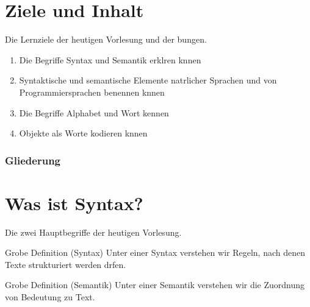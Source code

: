 %
%
%

%
%
%



\subtitle{Text und seine Bedeutung}

\date{27. Oktober 2006}




\begin{frame}
  \maketitle
\end{frame}


\section*{Ziele und Inhalt}

\begin{frame}{Die Lernziele der heutigen Vorlesung und der bungen.} 
  \begin{enumerate}
  \item Die Begriffe Syntax und Semantik erklren knnen
  \item Syntaktische und semantische Elemente natrlicher Sprachen und
    von Programmiersprachen benennen knnen
  \item Die Begriffe Alphabet und Wort kennen
  \item Objekte als Worte kodieren knnen
  \end{enumerate}
\end{frame}

\begin{frame}\frametitle<presentation>{Gliederung}
  \tableofcontents
\end{frame}


\section{Was ist Syntax?}

\begin{frame}{Die zwei Hauptbegriffe der heutigen Vorlesung.}
  \begin{block}{Grobe Definition (Syntax)}
    Unter einer \alert{Syntax} verstehen wir \alert{Regeln}, nach denen
    Texte \alert{strukturiert} werden drfen. 
  \end{block}
  \begin{block}{Grobe Definition (Semantik)}
    Unter einer \alert{Semantik} verstehen wir die Zuordnung von
    \alert{Bedeutung} zu Text.
  \end{block}
\end{frame}


